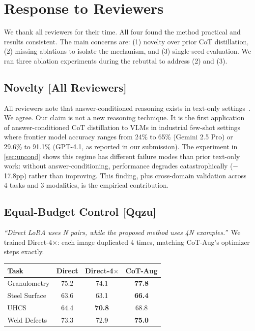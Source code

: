 \documentclass[10pt,twocolumn,letterpaper]{article}
\begin{document}
\thispagestyle{empty}
\appendix

\section{Response to Reviewers}

We thank all reviewers for their time. All four found the method practical and results consistent. The main concerns are: (1) novelty over prior CoT distillation, (2) missing ablations to isolate the mechanism, and (3) single-seed evaluation. We ran three ablation experiments during the rebuttal to address (2) and (3).

\subsection{Novelty [All Reviewers]}

All reviewers note that answer-conditioned reasoning exists in text-only settings~\cite{zelikman2022star,rajani2019explain,zohar2025videostar}. We agree. Our claim is not a new reasoning technique. It is the first application of answer-conditioned CoT distillation to VLMs in industrial few-shot settings where frontier model accuracy ranges from 24\% to 65\% (Gemini 2.5 Pro) or 29.6\% to 91.1\% (GPT-4.1, as reported in our submission). The experiment in \cref{sec:uncond} shows this regime has different failure modes than prior text-only work: without answer-conditioning, performance degrades catastrophically ($-$17.8pp) rather than improving. This finding, plus cross-domain validation across 4 tasks and 3 modalities, is the empirical contribution.

\subsection{Equal-Budget Control [Qqzu]}
\label{sec:budget}

\textit{``Direct LoRA uses N pairs, while the proposed method uses 4N examples.''}~We trained Direct-4$\times$: each image duplicated 4 times, matching CoT-Aug's optimizer steps exactly.

\vspace{-2pt}
\begin{table}[h]
\centering\small
\setlength{\tabcolsep}{4pt}
\begin{tabular}{lccc}
\toprule
Task & Direct & Direct-4$\times$ & CoT-Aug \\
\midrule
Granulometry & 75.2 & 74.1 & \textbf{77.8} \\
Steel Surface & 63.6 & 63.1 & \textbf{66.4} \\
UHCS & 64.4 & \textbf{70.8} & 68.8 \\
Weld Defects & 73.3 & 72.9 & \textbf{75.0} \\
\bottomrule
\end{tabular}
\vspace{-6pt}
\end{table}
\end{document}
